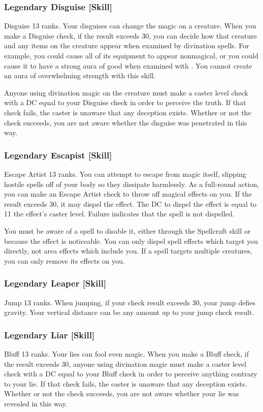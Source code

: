 \subsubsection{Legendary Disguise [Skill]}
\featpre Disguise 13 ranks.
\featben Your disguises can change the magic on a creature. When you make a Disguise check, if the result exceeds 30, you can decide how that creature and any items on the creature appear when examined by divination spells. For example, you could cause all of its equipment to appear nonmagical, or you could cause it to have a strong aura of good when examined with . You cannot create an aura of overwhelming strength with this skill.

Anyone using divination magic on the creature must make a caster level check with a DC equal to your Disguise check in order to perceive the truth. If that check fails, the caster is unaware that any deception exists. Whether or not the check succeeds, you are not aware whether the disguise was penetrated in this way.

\subsubsection{Legendary Escapist [Skill]}
\featpre Escape Artist 13 ranks.
\featben You can attempt to escape from magic itself, slipping hostile spells off of your body so they dissipate harmlessly. As a full-round action, you can make an Escape Artist check to throw off magical effects on you. If the result exceeds 30, it may dispel the effect. The DC to dispel the effect is equal to 11 \add the effect's caster level. Failure indicates that the spell is not dispelled.

You must be aware of a spell to disable it, either through the Spellcraft skill or because the effect is noticeable. You can only dispel spell effects which target you directly, not area effects which include you. If a spell targets multiple creatures, you can only remove its effects on you.

\subsubsection{Legendary Leaper [Skill]}
\featpre Jump 13 ranks.
\featben When jumping, if your check result exceeds 30, your jump defies gravity. Your vertical distance can be any amount up to your jump check result. 

\subsubsection{Legendary Liar [Skill]}
\featpre Bluff 13 ranks.
\featben Your lies can fool even magic. When you make a Bluff check, if the result exceeds 30, anyone using divination magic must make a caster level check with a DC equal to your Bluff check in order to perceive anything contrary to your lie. If that check fails, the caster is unaware that any deception exists. Whether or not the check succeeds, you are not aware whether your lie was revealed in this way.

